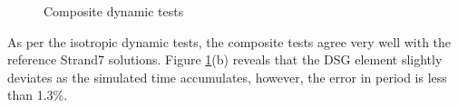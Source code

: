 \begin{figure}[H]
	\caption{\label{Composite dynamic benchmarks}Composite dynamic tests}
\end{figure}

As per the isotropic dynamic tests, the composite tests agree very well with the reference Strand7 solutions. Figure \ref{Composite dynamic benchmarks}(b) reveals that the DSG element slightly deviates as the simulated time accumulates, however, the error in period is less than 1.3\%.

